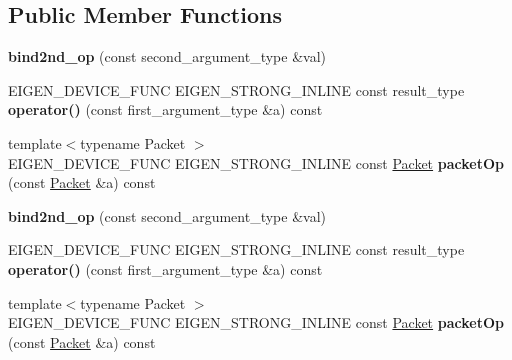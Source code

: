 \subsection*{Public Member Functions}
\begin{DoxyCompactItemize}
\item 
\mbox{\label{struct_eigen_1_1internal_1_1bind2nd__op_a62bc1a63faa8acd350cd47e58ee1db18}} 
{\bfseries bind2nd\+\_\+op} (const second\+\_\+argument\+\_\+type \&val)
\item 
\mbox{\label{struct_eigen_1_1internal_1_1bind2nd__op_a5bbc5ea88b92dc44ac50c4661211138c}} 
E\+I\+G\+E\+N\+\_\+\+D\+E\+V\+I\+C\+E\+\_\+\+F\+U\+NC E\+I\+G\+E\+N\+\_\+\+S\+T\+R\+O\+N\+G\+\_\+\+I\+N\+L\+I\+NE const result\+\_\+type {\bfseries operator()} (const first\+\_\+argument\+\_\+type \&a) const
\item 
\mbox{\label{struct_eigen_1_1internal_1_1bind2nd__op_a24c0369009febc49bebf4b1caa046206}} 
{\footnotesize template$<$typename Packet $>$ }\\E\+I\+G\+E\+N\+\_\+\+D\+E\+V\+I\+C\+E\+\_\+\+F\+U\+NC E\+I\+G\+E\+N\+\_\+\+S\+T\+R\+O\+N\+G\+\_\+\+I\+N\+L\+I\+NE const \hyperlink{union_eigen_1_1internal_1_1_packet}{Packet} {\bfseries packet\+Op} (const \hyperlink{union_eigen_1_1internal_1_1_packet}{Packet} \&a) const
\item 
\mbox{\label{struct_eigen_1_1internal_1_1bind2nd__op_a62bc1a63faa8acd350cd47e58ee1db18}} 
{\bfseries bind2nd\+\_\+op} (const second\+\_\+argument\+\_\+type \&val)
\item 
\mbox{\label{struct_eigen_1_1internal_1_1bind2nd__op_a5bbc5ea88b92dc44ac50c4661211138c}} 
E\+I\+G\+E\+N\+\_\+\+D\+E\+V\+I\+C\+E\+\_\+\+F\+U\+NC E\+I\+G\+E\+N\+\_\+\+S\+T\+R\+O\+N\+G\+\_\+\+I\+N\+L\+I\+NE const result\+\_\+type {\bfseries operator()} (const first\+\_\+argument\+\_\+type \&a) const
\item 
\mbox{\label{struct_eigen_1_1internal_1_1bind2nd__op_a24c0369009febc49bebf4b1caa046206}} 
{\footnotesize template$<$typename Packet $>$ }\\E\+I\+G\+E\+N\+\_\+\+D\+E\+V\+I\+C\+E\+\_\+\+F\+U\+NC E\+I\+G\+E\+N\+\_\+\+S\+T\+R\+O\+N\+G\+\_\+\+I\+N\+L\+I\+NE const \hyperlink{union_eigen_1_1internal_1_1_packet}{Packet} {\bfseries packet\+Op} (const \hyperlink{union_eigen_1_1internal_1_1_packet}{Packet} \&a) const
\end{DoxyCompactItemize}
